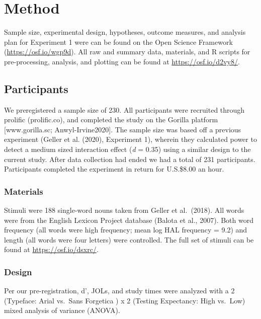 \documentclass[
  english,
  man]{apa6}
\begin{document}
\hypertarget{method}{%
\section{Method}\label{method}}

Sample size, experimental design, hypotheses, outcome measures, and analysis plan for Experiment 1 were can be found on the Open Science Framework (\url{https://osf.io/wgp9d}). All raw and summary data, materials, and R scripts for pre-processing, analysis, and plotting can be found at \url{https://osf.io/d2vy8/}.

\hypertarget{participants}{%
\subsection{Participants}\label{participants}}

We preregistered a sample size of 230. All participants were recruited through prolific (prolific.co), and completed the study on the Gorilla platform {[}www.gorilla.sc; Anwyl-Irvine2020{]}. The sample size was based off a previous experiment (Geller et al. (2020), Experiment 1), wherein they calculated power to detect a medium sized interaction effect (\emph{d} = 0.35) using a similar design to the current study. After data collection had ended we had a total of 231 participants. Participants completed the experiment in return for U.S.\$8.00 an hour.

\hypertarget{materials}{%
\subsubsection{Materials}\label{materials}}

Stimuli were 188 single-word nouns taken from Geller et al.~(2018). All words were from the English Lexicon Project database (Balota et al., 2007). Both word frequency (all words were high frequency; mean log HAL frequency = 9.2) and length (all words were four letters) were controlled. The full set of stimuli can be found at \url{https://osf.io/dsxrc/}.

\hypertarget{design}{%
\subsubsection{Design}\label{design}}

Per our pre-registration, d', JOLs, and study times were analyzed with a 2 (Typeface: Arial vs.~Sans Forgetica ) x 2 (Testing Expectancy: High vs.~Low) mixed analysis of variance (ANOVA).
\end{document}
